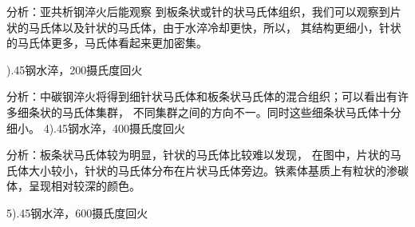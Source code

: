 \documentclass[a4paper,utf8]{article}
\begin{document}
分析：亚共析钢淬火后能观察
到板条状或针的状马氏体组织，我们可以观察到片状的马氏体以及针状的马氏体，由于水淬冷却更快，所以，
其结构更细小，针状的马氏体更多，马氏体看起来更加密集。

).45钢水淬，200摄氏度回火
\begin{figure}[!ht]
    \begin{floatrow}
    \end{floatrow}

\end{figure}

分析：中碳钢淬火将得到细针状马氏体和板条状马氏体的混合组织；可以看出有许多细条状的马氏体集群，
不同集群之间的方向不一。同时这些细条状马氏体十分细小。
4).45钢水淬，400摄氏度回火
\begin{figure}[!ht]
    \begin{floatrow}
    \end{floatrow}

\end{figure}

分析：板条状马氏体较为明显，针状的马氏体比较难以发现，
在图中，片状的马氏体大小较小，针状的马氏体分布在片状马氏体旁边。铁素体基质上有粒状的渗碳体，呈现相对较深的颜色。

5).45钢水淬，600摄氏度回火
\begin{figure}[!ht]
    \begin{floatrow}
    \end{floatrow}

\end{figure}
\end{document}
